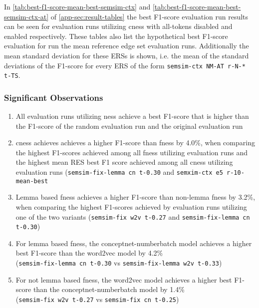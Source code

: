\documentclass[11pt]{scrreprt}
\newcounter{listcounter}
\begin{document}
{In \cref{tab:best-f1-score-mean-best-semsim-ctx} and \cref{tab:best-f1-score-mean-best-semsim-ctx-at} of \cref{app-sec:result-tables} the best F1-score evaluation run results can be seen for evaluation runs utilizing \gls{cness} with all-tokens disabled and enabled respectively. These tables also list the hypothetical best F1-score evaluation for run the mean reference edge set evaluation runs. Additionally the mean standard deviation for these ERSs is shown, i.e. the mean of the standard deviations of the F1-score for every ERS of the form \texttt{semsim-ctx NM-AT r-N-* t-TS}.


\subsubsection{Significant Observations}
\begin{enumerate}[label=\arabic{listcounter}.\arabic*]
	\item All evaluation runs utilizing \gls{ness} achieve a best F1-score that is higher than the F1-score of the random evaluation run and the original evaluation run \label{obs-itm:ness-higher-best-f1}
	\item \gls{cness} achieves achieves a higher F1-score than \gls{fness} by 4.0\%, when comparing the highest F1-scores achieved among all \gls{fness} utilizing evaluation runs and the highest mean RES best F1 score achieved among all \gls{cness} utilizing evaluation runs (\texttt{semsim-fix-lemma cn t-0.30} and \texttt{semxim-ctx e5 r-10-mean-best} \label{obs-itm:cness-higher-best-f1-than-fness}
	\item Lemma based \gls{fness} achieves a higher F1-score than non-lemma \gls{fness} by 3.2\%, when comparing the highest F1-scores achieved by evaluation runs utilizing one of the two variants (\texttt{semsim-fix w2v t-0.27} and \texttt{semsim-fix-lemma cn t-0.30}) \label{obs-itm:lemma-based-fness-higher-best-f1}
	\item For lemma based \gls{fness}, the conceptnet-numberbatch model achieves a higher best F1-score than the word2vec model by 4.2\% \\ (\texttt{semsim-fix-lemma cn t-0.30} vs \texttt{semsim-fix-lemma w2v t-0.33}) \label{obs-itm:lemma-fness-cn-better-than-w2v}
	\item For not lemma based \gls{fness}, the word2vec model achieves a higher best F1-score than the conceptnet-numberbatch model by 1.4\% \\ (\texttt{semsim-fix w2v t-0.27} vs \texttt{semsim-fix cn t-0.25}) \label{obs-itm:word-fness-w2v-better-than-cn}

\end{enumerate}}
\end{document}
